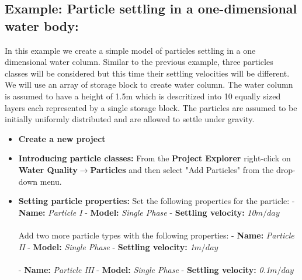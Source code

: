 \subsection{Example: Particle settling in a one-dimensional water body: } 
In this example we create a simple model of particles settling in a one dimensional water column. Similar to the previous example, three particles classes will be considered but this time their settling velocities will be different. We will use an array of storage block to create water column. The water column is assumed to have a height of 1.5m which is descritized into 10 equally sized layers each represented by a single storage block. The particles are assumed to be initially uniformly distributed and are allowed to settle under gravity. 
\begin{itemize}
\item \textbf{Create a new project} \\
\item \textbf{Introducing particle classes: } 
From the \textbf{Project Explorer} right-click on \textbf{Water Quality}$\rightarrow$\textbf{Particles} and then select "Add Particles" from the drop-down menu. 
\item \textbf{Setting particle properties: } Set the following properties for the particle: 
- \textbf{Name: } \textit{Particle I} 
- \textbf{Model: }\textit{Single Phase}
- \textbf{Settling velocity: }\textit{10$m/day$}
\\\\
Add two more particle types with the following properties:
- \textbf{Name: } \textit{Particle II} 
- \textbf{Model: }\textit{Single Phase}
- \textbf{Settling velocity: }\textit{1$m/day$}
\\\\
- \textbf{Name: } \textit{Particle III} 
- \textbf{Model: }\textit{Single Phase}
- \textbf{Settling velocity: }\textit{0.1$m/day$}


\end{itemize}
